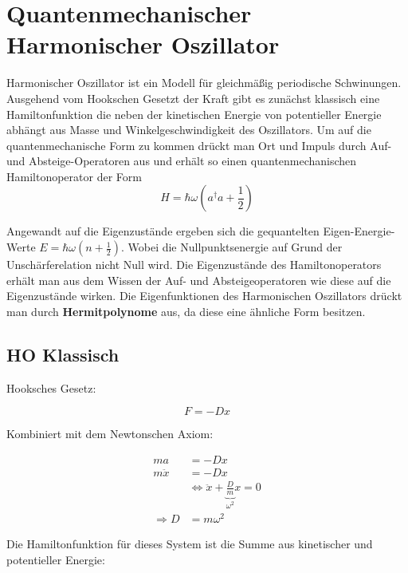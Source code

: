 



\section*{Quantenmechanischer Harmonischer Oszillator}


Harmonischer Oszillator ist ein Modell für gleichmäßig periodische Schwinungen. Ausgehend vom Hookschen Gesetzt der Kraft gibt es zunächst klassisch eine Hamiltonfunktion die neben der kinetischen Energie von potentieller Energie abhängt aus Masse und Winkelgeschwindigkeit des Oszillators. Um auf die quantenmechanische Form zu kommen drückt man Ort und Impuls durch Auf- und Absteige-Operatoren aus und erhält so einen quantenmechanischen Hamiltonoperator der Form
\begin{equation}
  \label{eq:49}
  H=\hbar\omega(a^\dagger a+\frac{1}{2})
\end{equation}

Angewandt auf die Eigenzustände ergeben sich die gequantelten Eigen-Energie-Werte \(E=\hbar\omega(n+\frac{1}{2})\). Wobei die Nullpunktsenergie auf Grund der Unschärferelation nicht Null wird. Die Eigenzustände des Hamiltonoperators erhält man aus dem Wissen der Auf- und Absteigeoperatoren wie diese auf die Eigenzustände wirken. Die Eigenfunktionen des Harmonischen Oszillators drückt man durch \textbf{Hermitpolynome} aus, da diese eine ähnliche Form besitzen.


\subsection*{HO Klassisch}


Hooksches Gesetz:

\begin{equation}
  \label{eq:1}
  F = -Dx
\end{equation}

Kombiniert mit dem Newtonschen Axiom:

\begin{align}
  ma &= -Dx  \\
  m\ddot x &= -Dx \\
&\Leftrightarrow \ddot x + \underbrace{\frac{D}{m}}_{\omega^2}x = 0 \\
\Rightarrow D &= m\omega^2\label{eq:2}
\end{align}

Die Hamiltonfunktion für dieses System ist die Summe aus kinetischer und potentieller Energie:


